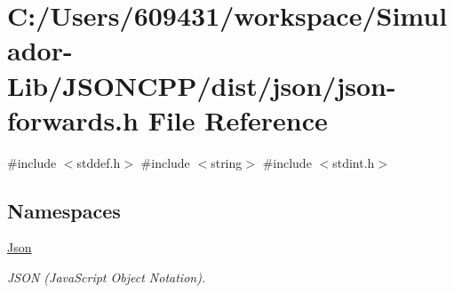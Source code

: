 \hypertarget{json-forwards_8h}{}\section{C\+:/\+Users/609431/workspace/\+Simulador-\/\+Lib/\+J\+S\+O\+N\+C\+P\+P/dist/json/json-\/forwards.h File Reference}
\label{json-forwards_8h}
{\ttfamily \#include $<$stddef.\+h$>$}\newline
{\ttfamily \#include $<$string$>$}\newline
{\ttfamily \#include $<$stdint.\+h$>$}\newline
\subsection*{Namespaces}
\begin{DoxyCompactItemize}
\item 
 \hyperlink{namespace_json}{Json}
\begin{DoxyCompactList}\small\item\em J\+S\+ON (Java\+Script Object Notation). \end{DoxyCompactList}\end{DoxyCompactItemize}
